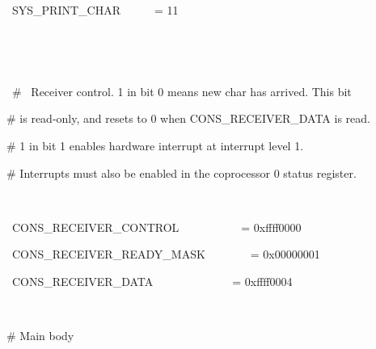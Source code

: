 \documentclass[12pt]{article}
\begin{document}
\begin{itemize}
{\fontsize{10pt}{12.0pt}\selectfont \ \ \ \ SYS\_PRINT\_CHAR\ \ \ \ \ \ =   11\par}\par

{\fontsize{10pt}{12.0pt}\selectfont \ \ \  \par}\par

{\fontsize{10pt}{12.0pt}\selectfont \ \ \  \par}\par

{\fontsize{10pt}{12.0pt}\selectfont \ \ \ \ $\#$ \ Receiver control.  1 in bit 0 means new char has arrived.  This bit\par}\par

{\fontsize{10pt}{12.0pt}\selectfont \ \ \  $\#$  is read-only, and resets to 0 when CONS\_RECEIVER\_DATA is read.\par}\par

{\fontsize{10pt}{12.0pt}\selectfont \ \ \  $\#$  1 in bit 1 enables hardware interrupt at interrupt level 1.\par}\par

{\fontsize{10pt}{12.0pt}\selectfont \ \ \  $\#$  Interrupts must also be enabled in the coprocessor 0 status register.\par}\par

{\fontsize{10pt}{12.0pt}\selectfont \ \ \  \par}\par

{\fontsize{10pt}{12.0pt}\selectfont \ \ \ \ CONS\_RECEIVER\_CONTROL\ \ \ \ \ \ \ \ \ \ \ =   0xffff0000\par}\par

{\fontsize{10pt}{12.0pt}\selectfont \ \ \ \ CONS\_RECEIVER\_READY\_MASK\ \ \ \ \ \ \ \ =   0x00000001\par}\par

{\fontsize{10pt}{12.0pt}\selectfont \ \ \ \ CONS\_RECEIVER\_DATA\ \ \ \ \ \ \ \ \ \ \ \ \ \ =   0xffff0004\par}\par

{\fontsize{10pt}{12.0pt}\selectfont \ \ \  \par}\par

{\fontsize{10pt}{12.0pt}\selectfont \ \ \  $\#$  Main body\par}\par


\end{itemize}
\end{document}
